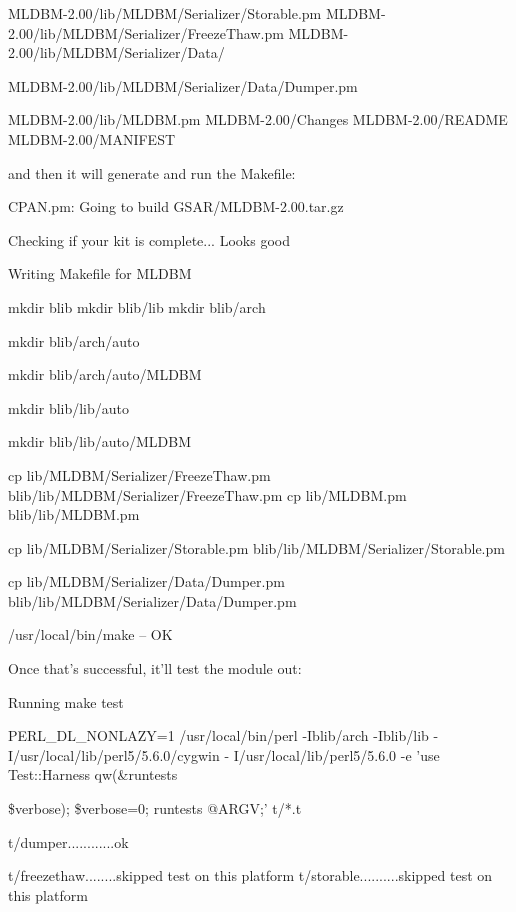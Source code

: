 \documentclass[a4paper,11pt]{book}
\begin{document}
\noindent MLDBM-2.00/lib/MLDBM/Serializer/Storable.pm MLDBM-2.00/lib/MLDBM/Serializer/FreezeThaw.pm MLDBM-2.00/lib/MLDBM/Serializer/Data/

\noindent MLDBM-2.00/lib/MLDBM/Serializer/Data/Dumper.pm

\noindent MLDBM-2.00/lib/MLDBM.pm MLDBM-2.00/Changes MLDBM-2.00/README MLDBM-2.00/MANIFEST

\noindent 

\noindent and then it will generate and run the Makefile:

\noindent 

\noindent CPAN.pm: Going to build GSAR/MLDBM-2.00.tar.gz

\noindent 

\noindent Checking if your kit is complete... Looks good

\noindent Writing Makefile for MLDBM

\noindent mkdir blib mkdir blib/lib mkdir blib/arch

\noindent mkdir blib/arch/auto

\noindent mkdir blib/arch/auto/MLDBM

\noindent mkdir blib/lib/auto

\noindent mkdir blib/lib/auto/MLDBM

\noindent cp lib/MLDBM/Serializer/FreezeThaw.pm blib/lib/MLDBM/Serializer/FreezeThaw.pm cp lib/MLDBM.pm blib/lib/MLDBM.pm

\noindent cp lib/MLDBM/Serializer/Storable.pm blib/lib/MLDBM/Serializer/Storable.pm

\noindent cp lib/MLDBM/Serializer/Data/Dumper.pm blib/lib/MLDBM/Serializer/Data/Dumper.pm

\noindent /usr/local/bin/make  -- OK

\noindent 

\noindent Once that's successful, it'll test the module out:

\noindent 

\noindent 

\noindent Running make test

\noindent PERL\_DL\_NONLAZY=1 /usr/local/bin/perl -Iblib/arch -Iblib/lib -I/usr/local/lib/perl5/5.6.0/cygwin - I/usr/local/lib/perl5/5.6.0 -e 'use Test::Harness qw(\&runtests

\noindent \$verbose); \$verbose=0; runtests @ARGV;' t/*.t

\noindent t/dumper............ok

\noindent t/freezethaw........skipped test on this platform t/storable..........skipped test on this platform
\end{document}
